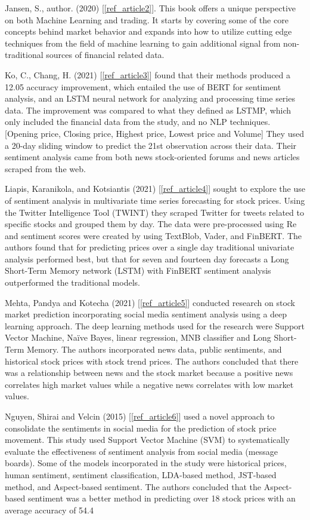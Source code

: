 \documentclass{llncs}
\begin{document}
Jansen, S., author. (2020) [\ref{ref_article2}].  This book offers a unique perspective on both Machine Learning and trading.  It starts by covering some of the core concepts behind market behavior and expands into how to utilize cutting edge techniques from the field of machine learning to gain additional signal from non-traditional sources of financial related data.

Ko, C., Chang, H. (2021) [\ref{ref_article3}] found that their methods produced a 12.05 accuracy improvement, which entailed the use of BERT for sentiment analysis, and an LSTM neural network for analyzing and processing time series data. The improvement was compared to what they defined as LSTMP, which only included the financial data from the study, and no NLP techniques. [Opening price, Closing price, Highest price, Lowest price and Volume] They used a 20-day sliding window to predict the 21st observation across their data. Their sentiment analysis came from both news stock-oriented forums and news articles scraped from the web.

Liapis, Karanikola, and Kotsiantis (2021) [\ref{ref_article4}] sought to explore the use of sentiment analysis in multivariate time series forecasting for stock prices. Using the Twitter Intelligence Tool (TWINT) they scraped Twitter for tweets related to specific stocks and grouped them by day. The data were pre-processed using Re and sentiment scores were created by using TextBlob, Vader, and FinBERT. The authors found that for predicting prices over a single day traditional univariate analysis performed best, but that for seven and fourteen day forecasts a Long Short-Term Memory network (LSTM) with FinBERT sentiment analysis outperformed the traditional models.

Mehta, Pandya and Kotecha (2021) [\ref{ref_article5}] conducted research on stock market prediction incorporating social media sentiment analysis using a deep learning approach. The deep learning methods used for the research were Support Vector Machine, Naïve Bayes, linear regression, MNB classifier and Long Short-Term Memory. The authors incorporated news data, public sentiments, and historical stock prices with stock trend prices. The authors concluded that there was a relationship between news and the stock market because a positive news correlates high market values while a negative news correlates with low market values.

Nguyen, Shirai and Velcin (2015) [\ref{ref_article6}] used a novel approach to consolidate the sentiments in social media for the prediction of stock price movement. This study used Support Vector Machine (SVM) to systematically evaluate the effectiveness of sentiment analysis from social media (message boards). Some of the models incorporated in the study were historical prices, human sentiment, sentiment classification, LDA-based method, JST-based method, and Aspect-based sentiment.  The authors concluded that the Aspect-based sentiment was a better method in predicting over 18 stock prices with an average accuracy of 54.4%
\end{document}
